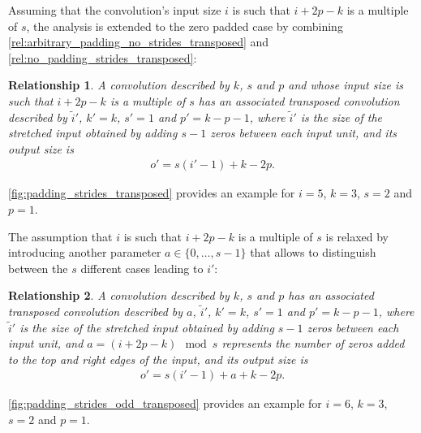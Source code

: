 \documentclass[notitlepage]{report}
\newtheorem{relationship}{Relationship}
\begin{document}
Assuming that the convolution's input size $i$ is such that $i + 2p - k$ is a
multiple of $s$, the analysis is extended to the zero padded case by combining
\autoref{rel:arbitrary_padding_no_strides_transposed} and
\autoref{rel:no_padding_strides_transposed}:

\begin{relationship}\label{rel:padding_strides_transposed}
A convolution described by $k$, $s$ and $p$ and whose input size is such that $i
+ 2p - k$ is a multiple of $s$ has an associated transposed convolution
described by $\tilde{i}'$, $k' = k$, $s' = 1$ and $p' = k - p - 1$, where
$\tilde{i}'$ is the size of the stretched input obtained by adding $s - 1$ zeros
between each input unit, and its output size is
\begin{equation*}
\begin{split}
    o' = s (i' - 1) + k - 2p.
\end{split}
\end{equation*}
\end{relationship}

\autoref{fig:padding_strides_transposed} provides an example for $i = 5$, $k =
3$, $s = 2$ and $p = 1$.

The assumption that $i$ is such that $i + 2p - k$ is a multiple of $s$ is
relaxed by introducing another parameter $a \in \{0, \ldots, s - 1\}$ that
allows to distinguish between the $s$ different cases leading to $i'$:

\begin{relationship}\label{rel:padding_strides_transposed_odd}
A convolution described by $k$, $s$ and $p$ has an associated transposed
convolution described by $a$, $\tilde{i}'$, $k' = k$, $s' = 1$ and $p' = k - p -
1$, where $\tilde{i}'$ is the size of the stretched input obtained by adding $s
- 1$ zeros between each input unit, and $a = (i + 2p - k) \mod s$ represents the
number of zeros added to the top and right edges of the input, and its output
size is
\begin{equation*}
\begin{split}
    o' = s (i' - 1) + a + k - 2p.
\end{split}
\end{equation*}
\end{relationship}

\autoref{fig:padding_strides_odd_transposed} provides an example for $i = 6$, $k
= 3$, $s = 2$ and $p = 1$.
\end{document}
